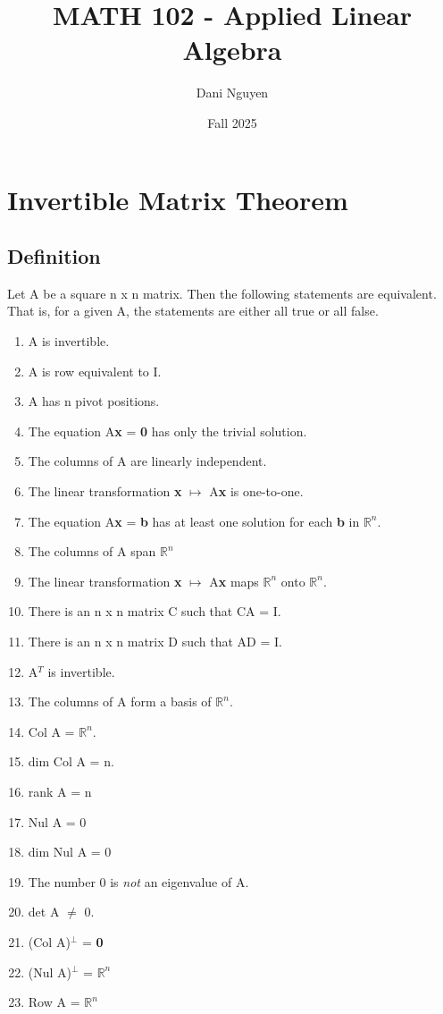 \documentclass[12pt, letterpaper]{article}
\title{MATH 102 - Applied Linear Algebra}
\author{Dani Nguyen}
\date{Fall 2025}
\begin{document}
\maketitle
\tableofcontents

\section{Invertible Matrix Theorem}
\subsection{Definition}
Let A be a square n x n matrix. Then the following statements are
equivalent. That is, for a given A, the statements are either all 
true or all false.
\begin{enumerate}
    \item A is invertible.
    \item A is row equivalent to I.
    \item A has n pivot positions.
    \item The equation A\textbf{x} = \textbf{0} has only the trivial solution.
    \item The columns of A are linearly independent.
    \item The linear transformation \textbf{x} $\mapsto$ A\textbf{x} is one-to-one.
    \item The equation A\textbf{x} = \textbf{b} has at least one solution for each \textbf{b} in $\mathbb{R}^n$.
    \item The columns of A span $\mathbb{R}^n$
    \item The linear transformation \textbf{x} $\mapsto$ A\textbf{x} maps $\mathbb{R}^n$ onto $\mathbb{R}^n$.
    \item There is an n x n matrix C such that CA = I.
    \item There is an n x n matrix D such that AD = I.
    \item A$^T$ is invertible.
    \item The columns of A form a basis of $\mathbb{R}^n$.
    \item Col A = $\mathbb{R}^n$.
    \item dim Col A = n.
    \item rank A = n
    \item Nul A = {0}
    \item dim Nul A = 0
    \item The number 0 is \emph{not} an eigenvalue of A.
    \item det A $\neq$ 0.
    \item (Col A)$^\bot$ = \textbf{0}
    \item (Nul A)$^\bot$ = $\mathbb{R}^n$
    \item Row A = $\mathbb{R}^n$
\end{enumerate}
\end{document}
